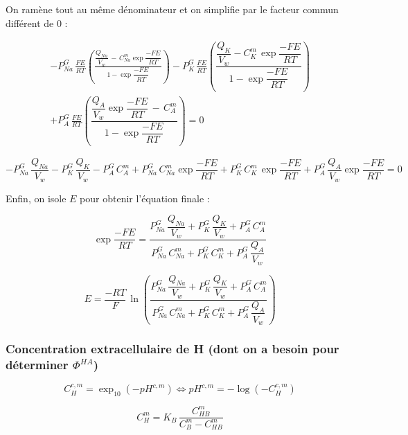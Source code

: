 \documentclass[a4paper,fleqn]{article}
\begin{document}
On ramène tout au même dénominateur et on simplifie par le facteur commun différent de $0$ :

\begin{multline}
-P_{Na}^{G}\,\frac{FE}{RT}\left(\frac{\dfrac{Q_{Na}}{V_w}\,-\,{C_{Na}^{m}\exp{\dfrac{-FE}{RT}}}}{1 - \exp{\dfrac{-FE}{RT}}}\right)-P_{K}^{G}\,\frac{FE}{RT}\left(\dfrac{\dfrac{Q_{K}}{V_w}-{C_{K}^{m}\,\exp{\dfrac{-FE}{RT}}}}{1 - \exp{\dfrac{-FE}{RT}}}\right)\\
+P_{A}^{G}\,\frac{FE}{RT}\left(\dfrac{\dfrac{Q_{A}}{V_w}\exp{\dfrac{-FE}{RT}}\,-\,C_{A}^{m}}{1 - \exp{\dfrac{-FE}{RT}}}\right)=0
\end{multline}


\begin{equation}
-P_{Na}^{G}\,\dfrac{Q_{Na}}{V_w}-P_{K}^{G}\,\dfrac{Q_{K}}{V_w}-P_{A}^{G}\,C_{A}^{m}+P_{Na}^{G}\,C_{Na}^{m}\exp{\dfrac{-FE}{RT}}+P_{K}^{G}\,C_{K}^{m}\,\exp{\dfrac{-FE}{RT}}+P_{A}^{G}\,\dfrac{Q_{A}}{V_w}\exp{\dfrac{-FE}{RT}}=0
\end{equation}

Enfin, on isole $E$ pour obtenir l'équation finale :

\begin{equation}
\exp{\dfrac{-FE}{RT}}=\dfrac{P_{Na}^{G}\,\dfrac{Q_{Na}}{V_w}+P_{K}^{G}\,\dfrac{Q_{K}}{V_w}+P_{A}^{G}\,C_{A}^{m}}{P_{Na}^{G}\,C_{Na}^{m}+P_{K}^{G}\,C_{K}^{m}+P_{A}^{G}\,\dfrac{Q_{A}}{V_w}}
\end{equation}

\begin{equation*}
E=\dfrac{-RT}{F}\,\ln\left(\dfrac{P_{Na}^{G}\,\dfrac{Q_{Na}}{V_w}+P_{K}^{G}\,\dfrac{Q_{K}}{V_w}+P_{A}^{G}\,C_{A}^{m}}{P_{Na}^{G}\,C_{Na}^{m}+P_{K}^{G}\,C_{K}^{m}+P_{A}^{G}\,\dfrac{Q_{A}}{V_w}}\right)
\end{equation*}

\subsubsection*{Concentration extracellulaire de H (dont on a besoin pour déterminer $\Phi^{HA}$)}
\begin{equation}
{C_{H}^{c,m}=\exp_{10}{\left(-pH^{c,m}\right)}}\Longleftrightarrow{pH^{c,m}=-\log{\left(-C_{H}^{c,m}\right)}}\label{eq:pH}
\end{equation}

\begin{equation}
C_{H}^{m}=K_B\,\dfrac{C_{HB}^m}{C_{B}^m-C_{HB}^m}
\end{equation}
\end{document}
